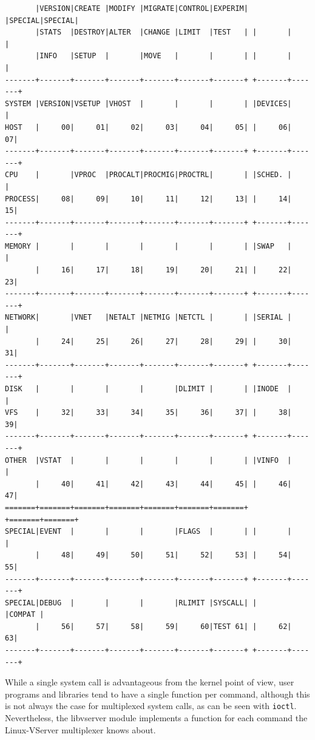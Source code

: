 \begin{center}
\small
\begin{verbatim}
       |VERSION|CREATE |MODIFY |MIGRATE|CONTROL|EXPERIM| |SPECIAL|SPECIAL|
       |STATS  |DESTROY|ALTER  |CHANGE |LIMIT  |TEST   | |       |       |
       |INFO   |SETUP  |       |MOVE   |       |       | |       |       |
-------+-------+-------+-------+-------+-------+-------+ +-------+-------+
SYSTEM |VERSION|VSETUP |VHOST  |       |       |       | |DEVICES|       |
HOST   |     00|     01|     02|     03|     04|     05| |     06|     07|
-------+-------+-------+-------+-------+-------+-------+ +-------+-------+
CPU    |       |VPROC  |PROCALT|PROCMIG|PROCTRL|       | |SCHED. |       |
PROCESS|     08|     09|     10|     11|     12|     13| |     14|     15|
-------+-------+-------+-------+-------+-------+-------+ +-------+-------+
MEMORY |       |       |       |       |       |       | |SWAP   |       |
       |     16|     17|     18|     19|     20|     21| |     22|     23|
-------+-------+-------+-------+-------+-------+-------+ +-------+-------+
NETWORK|       |VNET   |NETALT |NETMIG |NETCTL |       | |SERIAL |       |
       |     24|     25|     26|     27|     28|     29| |     30|     31|
-------+-------+-------+-------+-------+-------+-------+ +-------+-------+
DISK   |       |       |       |       |DLIMIT |       | |INODE  |       |
VFS    |     32|     33|     34|     35|     36|     37| |     38|     39|
-------+-------+-------+-------+-------+-------+-------+ +-------+-------+
OTHER  |VSTAT  |       |       |       |       |       | |VINFO  |       |
       |     40|     41|     42|     43|     44|     45| |     46|     47|
=======+=======+=======+=======+=======+=======+=======+ +=======+=======+
SPECIAL|EVENT  |       |       |       |FLAGS  |       | |       |       |
       |     48|     49|     50|     51|     52|     53| |     54|     55|
-------+-------+-------+-------+-------+-------+-------+ +-------+-------+
SPECIAL|DEBUG  |       |       |       |RLIMIT |SYSCALL| |       |COMPAT |
       |     56|     57|     58|     59|     60|TEST 61| |     62|     63|
-------+-------+-------+-------+-------+-------+-------+ +-------+-------+
\end{verbatim}
\end{center}

While a single system call is advantageous from the kernel point of view, user
programs and libraries tend to have a single function per command, although
this is not always the case for multiplexed system calls, as can be seen with
\texttt{ioctl}. Nevertheless, the libvserver module implements a function for
each command the Linux-VServer multiplexer knows about.

